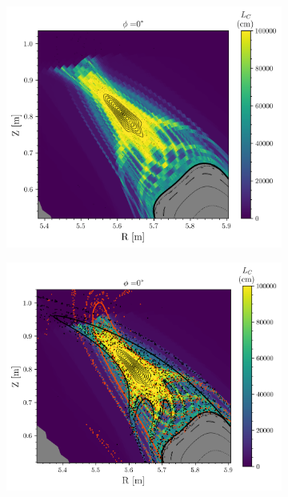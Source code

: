 \begin{figure}[H]
    \centering
    \begin{minipage}{0.45\textwidth} %
        \centering
        \begin{subfigure}[b]{\textwidth}
            \centering
            \includegraphics[width=\textwidth]{images/w7x-gym00-1750/gym00_1750_cnpoints.png}
            \caption{}
            \label{fig:}
        \end{subfigure}
        \vfill
        \vspace{10px}
        \vfill
        \begin{subfigure}[b]{0.99\textwidth}
            \centering
            \includegraphics[width=\textwidth]{images/w7x-gym00-1750/gym00_1750_points.png}

\end{subfigure}
\end{minipage}
\end{figure}
